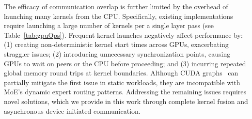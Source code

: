 The efficacy of communication overlap is further limited by the overhead of
launching many kernels from the CPU\@.
Specifically, existing implementations~\cite{pmlr-v162-rajbhandari22a, comet, megatron, fastermoe}
require launching a large number of kernels per a single layer pass (see Table~\ref{tab:gpuOps}).
Frequent kernel launches negatively affect performance by:
(1) creating non-deterministic kernel start times across GPUs, exacerbating straggler issues;
(2) introducing unnecessary synchronization points, causing GPUs to wait on peers or the CPU before proceeding;
and (3) incurring repeated global memory round trips at kernel boundaries.
Although CUDA graphs~\cite{cuda_graphs_nvidia_blog} can partially mitigate the first issue in static workloads,
they are incompatible with MoE's dynamic expert routing patterns.
Addressing the remaining issues requires novel solutions,
which we provide in this work through complete kernel fusion and asynchronous device-initiated communication.


